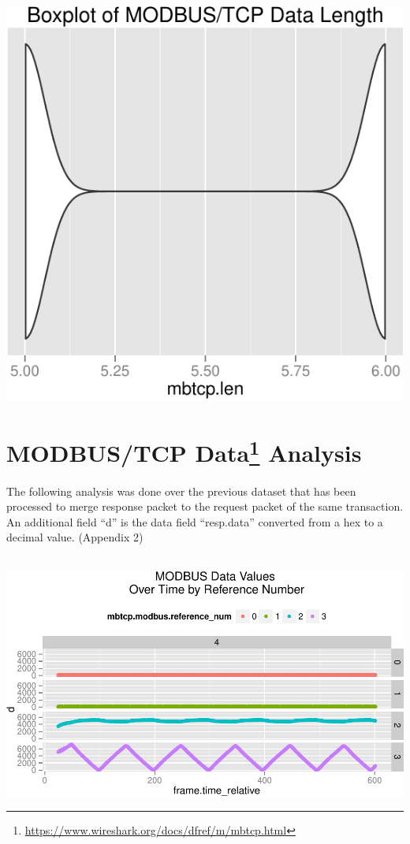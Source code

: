 \documentclass[]{article}
\let\rmarkdownfootnote\footnote%
\def\footnote{\protect\rmarkdownfootnote}
\begin{document}
\begin{center}\includegraphics{modbus_files/figure-latex/unnamed-chunk-15-1} \end{center}

\pagebreak

\section[MODBUS/TCP Data Analysis]{MODBUS/TCP Data\footnote{\url{https://www.wireshark.org/docs/dfref/m/mbtcp.html}}
Analysis}\label{modbustcp-data1-analysis}

The following analysis was done over the previous dataset that has been
processed to merge response packet to the request packet of the same
transaction. An additional field ``d'' is the data field ``resp.data''
converted from a hex to a decimal value. (Appendix 2)
~\\\hspace*{0.333em}\\\hspace*{0.333em}

\includegraphics{modbus_files/figure-latex/unnamed-chunk-16-1.pdf}
\end{document}
